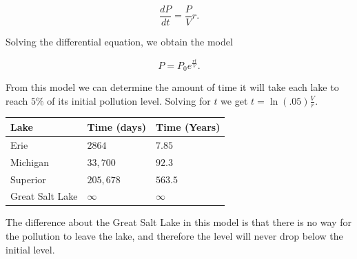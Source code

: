 \documentclass[12pt]{article}
\newenvironment{exercise}[2][Exercise]{\begin{trivlist}
\item[\hskip \labelsep {\bfseries #1}\hskip \labelsep {\bfseries #2.}]}{\end{trivlist}}
\begin{document}
\begin{exercise}{1}
$$\frac{dP}{dt} = \frac{P}{V}r.$$ 

Solving the differential equation, we obtain the model 

$$P = P_0 e^{\frac{rt}{V}}.$$

From this model we can determine the amount of time it will take each lake to reach $5\%$ of its initial pollution level. Solving for $t$ we get $t = \ln{(.05)} \frac{V}{r}.$
\begin{center}
	\begin{tabular}{lll}
		Lake & Time (days) & Time (Years) \\ \hline
		Erie & $2864$ & $7.85$ \\
		Michigan & $33,700$ & $92.3$ \\
		Superior & $205,678$ & $563.5$ \\
		Great Salt Lake & $\infty$ & $\infty$ \\
	\end{tabular}
\end{center}
The difference about the Great Salt Lake in this model is that there is no way for the pollution to leave the lake, and therefore the level will never drop below the initial level.

\end{exercise}
 
\end{document}
